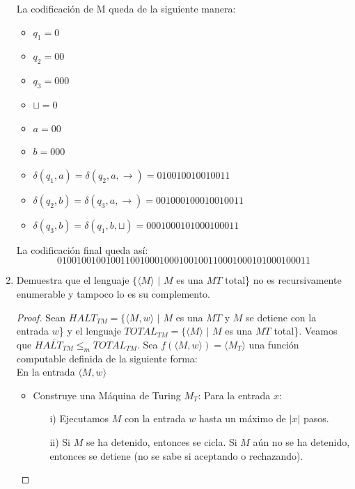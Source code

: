 \documentclass[letterpaper,10pt]{article}
\begin{document}
\begin{enumerate}
       				\newpage
       				La codificación de M queda de la siguiente manera:\\
       				\begin{itemize}
       					\item $q_1=0$
       					\item $q_2=00$
       					\item $q_3=000$
       					\item $\sqcup = 0$
       					\item $a=00$
       					\item $b=000$ 
       					\item $\delta (q_1,a) = \delta (q_2,a,\rightarrow) = 010010010010011$
       					\item $\delta (q_2,b) = \delta (q_3,a,\rightarrow) =001000100010010011$
       					\item $\delta (q_3,b) = \delta (q_1,b,\sqcup) =0001000101000100011$
       				\end{itemize}
       			La codificación final queda así:
       				$$010010010010011 001000100010010011 0001000101000100011$$
       
       \item Demuestra que el lenguaje $\{\langle M \rangle$ $|$ $M$ es
       una $MT$ total\} no es recursivamente enumerable y tampoco lo es 
       su complemento.
       \begin{proof}
           Sean $HALT_{TM} = \{\langle M, w \rangle$ $|$ $M$ es
           una $MT$ y $M$ se detiene con la entrada $w$\} y el lenguaje
           $TOTAL_{TM} = \{\langle M \rangle$ $|$ $M$ es una $MT$ total\}. 
           Veamos que $\overline{HALT_{TM}} \leq_m TOTAL_{TM}$. Sea 
           $f(\langle M, w \rangle) = \langle M_{T} \rangle$ una función
           computable definida de la siguiente forma: \\
           En la entrada $\langle M, w \rangle$
           \begin{itemize}
               \item Construye una Máquina de Turing $M_{T}$: 
               Para la entrada $x$:
               \begin{itemize}
                   \item [i)] Ejecutamos $M$ con la entrada $w$ hasta un máximo
                   de $|x|$ pasos.
                   \item [ii)] Si $M$ se ha detenido, entonces se cicla. Si $M$
                   aún no se ha detenido, entonces se
                   detiene (no se sabe si aceptando o
                   rechazando).
               \end{itemize}


\end{itemize}
\end{proof}
\end{enumerate}
\end{document}
